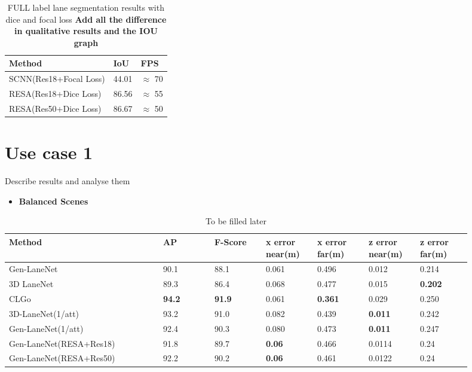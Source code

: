     
     \begin{table}[h]
    \caption{FULL label lane segmentation results with dice and focal loss \textbf{Add all the difference in qualitative results and the IOU graph}}
    \centering
    \begin{tabular}{|l|l|l|}
    \hline
        \textbf{Method} & \textbf{IoU} & \textbf{FPS} \\ \hline
        SCNN(Res18+Focal Loss) & 44.01 & $\approx$ 70 \\\hline
        RESA(Res18+Dice Loss) & 86.56 & $\approx$ 55 \\\hline
        RESA(Res50+Dice Loss) & 86.67 & $\approx$ 50 \\\hline
    \end{tabular}
\end{table}

    \section{Use case 1}

    Describe results and analyse them
    \begin{itemize}
        \item \textbf{Balanced Scenes}
    \end{itemize}

    \begin{table}[htbp]
    \addtolength{\tabcolsep}{-1pt}
    \begin{center}
    \caption{To be filled later}
    \begin{tabular}{|p{0.3\linewidth}|p{0.1\linewidth}|p{0.1\linewidth}|p{0.1\linewidth}|p{0.1\linewidth}|p{0.1\linewidth}|p{0.1\linewidth}|}
    \hline
        \textbf{Method} & \textbf{AP} & \textbf{F-Score} & \textbf{x error near(m)} & \textbf{x error far(m)} & \textbf{z error near(m)} & \textbf{z error far(m)} \\ \hline
        Gen-LaneNet & 90.1 & 88.1 & 0.061 & 0.496 & 0.012 & 0.214 \\ \hline
        3D LaneNet & 89.3 & 86.4 & 0.068 & 0.477 & 0.015 & \textbf{0.202} \\ \hline
        CLGo & \textbf{94.2} &\textbf{ 91.9} & 0.061 & \textbf{0.361} & 0.029 & 0.250 \\ \hline
        3D-LaneNet(1/att) &  93.2 & 91.0 & 0.082 & 0.439 & \textbf{0.011} & 0.242 \\ \hline
        Gen-LaneNet(1/att) & 92.4 & 90.3 & 0.080 & 0.473 & \textbf{0.011} & 0.247 \\ \hline
        Gen-LaneNet(RESA+Res18) & 91.8 & 89.7 & \textbf{0.06} & 0.466 & 0.0114 & 0.24 \\ \hline
        Gen-LaneNet(RESA+Res50) & 92.2 & 90.2 &\textbf{ 0.06} & 0.461 & 0.0122 & 0.24 \\ \hline
    \end{tabular}
    \end{center}
\end{table}

